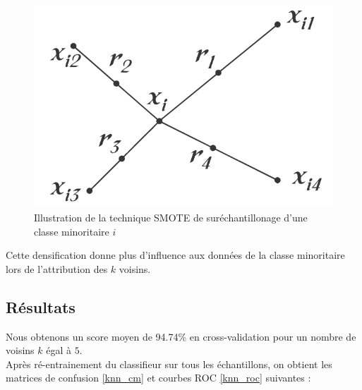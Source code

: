 \documentclass{book}
\begin{document}
\begin{figure}[H]
 \begin{center}
 \includegraphics[scale=0.3]{../5_diaporama/images/oversampling/smote.png}
 \caption{Illustration de la technique SMOTE de suréchantillonage d'une classe minoritaire $i$}
 \label{smote}
 \end{center}
\end{figure}

Cette densification donne plus d'influence aux données de la classe minoritaire lors de l'attribution des $k$ voisins.\\

\subsection{Résultats}

Nous obtenons un score moyen de 94.74\% en cross-validation pour un nombre de voisins $k$ égal à $5$. \\
Après ré-entrainement du classifieur sur tous les échantillons, on obtient les matrices de confusion \ref{knn_cm} et courbes ROC \ref{knn_roc} suivantes :
\end{document}
